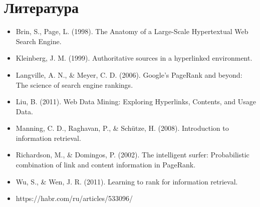 \documentclass[a4paper]{article}
\begin{document}
\section{Литература}	
\begin{itemize}
	\item Brin, S., Page, L. (1998). The Anatomy of a Large-Scale Hypertextual Web Search Engine.
	\item Kleinberg, J. M. (1999). Authoritative sources in a hyperlinked environment.
	\item Langville, A. N., \& Meyer, C. D. (2006). Google's PageRank and beyond: The science of search engine rankings.
	\item Liu, B. (2011). Web Data Mining: Exploring Hyperlinks, Contents, and Usage Data.
	\item Manning, C. D., Raghavan, P., \& Schütze, H. (2008). Introduction to information retrieval.
	\item Richardson, M., \& Domingos, P. (2002). The intelligent surfer: Probabilistic combination of link and content information in PageRank.
	\item Wu, S., \& Wen, J. R. (2011). Learning to rank for information retrieval.
	\item https://habr.com/ru/articles/533096/
\end{itemize}
	
	
\end{document}
